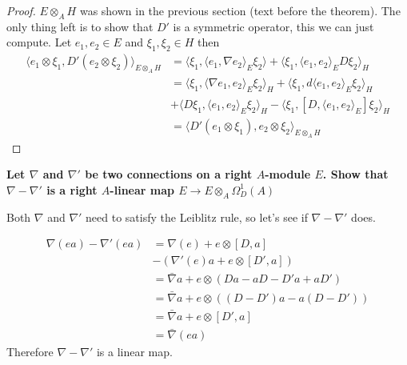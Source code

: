 \documentclass[a4paper]{article}
\newcounter{exercise}
\newenvironment{MyExercise}%
{\begin{mdframed}[style=exercisestyle]}{\end{mdframed}}
\theoremstyle{definition}
\theoremstyle{definition}
\theoremstyle{definition}
\theoremstyle{theorem}
\theoremstyle{theorem}
\begin{document}
\begin{proof}
    $E\otimes _A H$ was shown in the previous section (text before the
    theorem). The only thing left is to show that $D'$ is a symmetric
    operator, this we can just compute. Let $e_1, e_2 \in E$ and $\xi _1,
    \xi _2 \in H$ then
    \begin{align*}
        \langle e_1 \otimes \xi _1, D'(e_2 \otimes \xi_2)\rangle _{E\otimes _A H} &=
        \langle \xi _1, \langle e_1, \nabla e_2\rangle _E  \xi _2\rangle  + \langle \xi _1 , \langle e_1, e_2\rangle _E D\xi
        _2\rangle _H \\
        &= \langle \xi _1, \langle \nabla e_1, e_2\rangle _E \xi _2\rangle _H + \langle \xi _1, d\langle e_1, e_2\rangle  _E
        \xi _2\rangle _H \\
        &+ \langle D\xi _1,\langle e_1, e_2\rangle _E \xi _2\rangle _H - \langle \xi _1, [D, \langle e_1, e_2\rangle _E] \xi
        _2 \rangle _H \\
        &= \langle D'(e_1 \otimes \xi _1), e_2 \otimes \xi _2\rangle _{E \otimes _A H}
    \end{align*}
\end{proof}

\begin{MyExercise}
    \textbf{
    Let $\nabla$ and $\nabla'$ be two connections on a right $A$-module
    $E$. Show that $\nabla - \nabla'$ is a right $A$-linear map
    $E \rightarrow E\otimes _A \Omega _D^1(A)$
}\newline

    Both $\nabla$ and $\nabla'$ need to satisfy the Leiblitz rule, so
    let's see if $\nabla - \nabla'$ does.

    \begin{align*}
        \nabla(ea)-\nabla'(ea)&=\nabla(e) + e\otimes[D, a]\\
        &-(\nabla'(e)a + e\otimes[D',a])\\
        &=\bar{\nabla}a + e\otimes(Da-aD-D'a+aD')\\
        &=\bar{\nabla}a + e\otimes((D-D')a-a(D-D'))\\
        &=\bar{\nabla}a + e\otimes[D', a]\\
        &=\bar{\nabla}(ea)
    \end{align*}
    Therefore $\nabla-\nabla'$ is a linear map.
\end{MyExercise}
\end{document}
